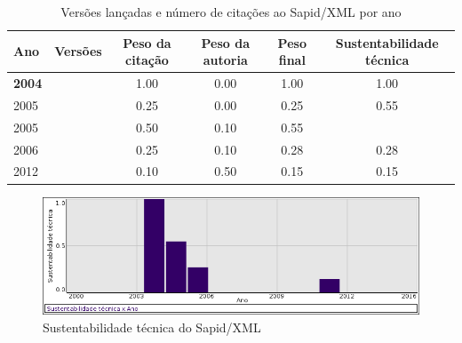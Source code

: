\begin{table}[H]
\caption{Versões lançadas e número de citações ao Sapid/XML por ano}
\centering
\begin{tabular}{| l | c | c | c | c | c |}
  \hline
  Ano & Versões & Peso da citação & Peso da autoria & Peso final & Sustentabilidade técnica \\
  \hline
            {\bf 2004}
          &
          
          &
          1.00
          &
          0.00
          &
          1.00
          &
            {\color{blue} 1.00}
          \\
\hline
            2005
          &
          
          &
          0.25
          &
          0.00
          &
          0.25
          &
            {\color{blue} 0.55}
          \\
            2005
          &
          
          &
          0.50
          &
          0.10
          &
          0.55
          &
          \\
\hline
            2006
          &
          
          &
          0.25
          &
          0.10
          &
          0.28
          &
            {\color{red} 0.28}
          \\
\hline
            2012
          &
          
          &
          0.10
          &
          0.50
          &
          0.15
          &
            {\color{red} 0.15}
          \\
\hline
\end{tabular}
\end{table}

\begin{figure}[h]
  \center
  \includegraphics[scale=0.50]{result-documents/charts/sapid-xml.png}
  \caption{Sustentabilidade técnica do Sapid/XML}
\end{figure}


